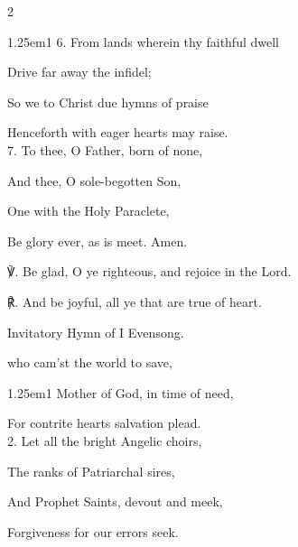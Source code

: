 \begin{paracol}{2}
\begin{hangparas}{1.25em}{1}
6. From lands wherein thy faithful dwell

Drive far away the infidel;

So we to Christ due hymns of praise

Henceforth with eager hearts may raise.\\

7. To thee, O Father, born of none,

And thee, O sole-begotten Son,

One with the Holy Paraclete,

Be glory ever, as is meet. Amen.\\
\end{hangparas}

℣. Be glad, O ye righteous, and rejoice in the Lord.

℟. And be joyful, all ye that are true of heart.


\switchcolumn

\mattins
{}

\begin{rubric}
	Invitatory Hymn of I Evensong.
\end{rubric}

\mattinsOfficeHymn
{} who cam'st the world to save,


\begin{hangparas}{1.25em}{1}
Mother of God, in time of need,

For contrite hearts salvation plead.\\

2. Let all the bright Angelic choirs,

The ranks of Patriarchal sires,

And Prophet Saints, devout and meek,

Forgiveness for our errors seek.\\


\end{hangparas}
\end{paracol}
